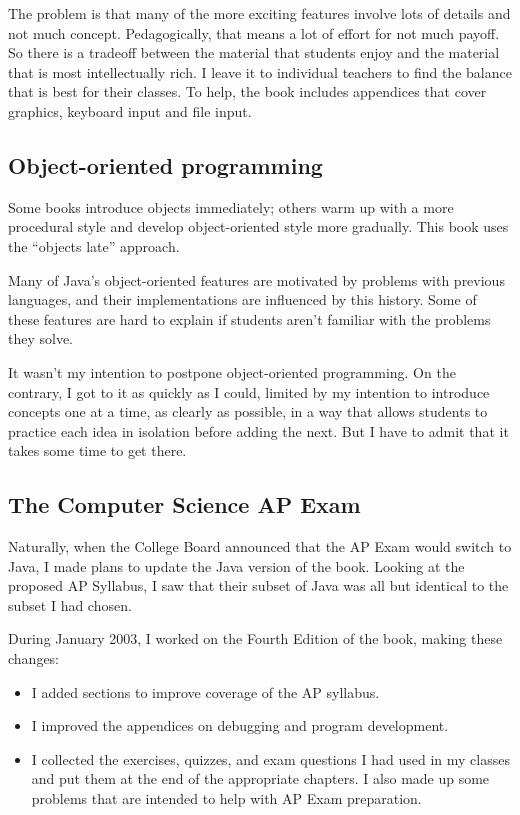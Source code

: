 \documentclass[12pt]{book}
\theoremstyle{definition}
\begin{document}
The problem is that many of the more exciting features involve
lots of details and not much concept.  Pedagogically, that means
a lot of effort for not much payoff.  So there is a tradeoff between
the material that students enjoy and the material that is most
intellectually rich.  I leave it to individual teachers to find
the balance that is best for their classes.  To help, the book
includes appendices that cover graphics, keyboard input and
file input.

\subsection*{Object-oriented programming}

Some books introduce objects immediately; others warm up with a more
procedural style and develop object-oriented style more gradually.
This book uses the ``objects late'' approach.

Many of Java's object-oriented features are motivated
by problems with previous languages, and their implementations
are influenced by this history.  Some of these features are
hard to explain if students aren't familiar with the problems
they solve.

It wasn't my intention to postpone object-oriented programming.
On the contrary, I got to it as quickly as I could, limited by
my intention to introduce concepts one at a time, as clearly
as possible, in a way that allows students to practice each
idea in isolation before adding the next.  But I have to admit
that it takes some time to get there.

\subsection*{The Computer Science AP Exam}

Naturally, when the College Board announced that the AP Exam
would switch to Java, I made plans to update the Java version of
the book.  Looking at the proposed AP Syllabus, I saw that their
subset of Java was all but identical to the subset I had chosen.

During January 2003, I worked on the Fourth Edition of the book,
making these changes:

\begin{itemize}

\item I added sections to improve coverage of the AP syllabus.

\item I improved the appendices on debugging and program development.

\item I collected the exercises, quizzes, and exam questions I
had used in my classes and put them at the end of the appropriate
chapters.  I also made up some problems that are intended to
help with AP Exam preparation.

\end{itemize}
\end{document}
